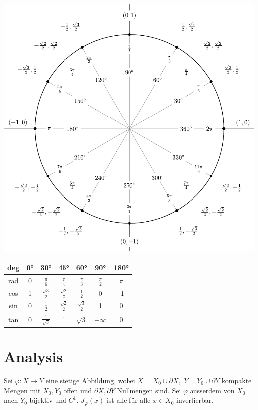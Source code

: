 \documentclass[a4paper,10pt]{article}
\begin{document}
\begin{center}
	\includegraphics[width=0.7 \linewidth]{include_degrees_circle.pdf}
\end{center}

\begin{mainbox}{}
	\begin{center}
		\begin{tabular}{c|cccccc}
			deg & 0° & 30°                  & 45°                  & 60°                  & 90°             & 180°  \\
			\midrule
			rad & 0  & $\frac{\pi}{6}$      & $\frac{\pi}{4}$      & $\frac{\pi}{3}$      & $\frac{\pi}{2}$ & $\pi$ \\
			cos & 1  & $\frac{\sqrt{3}}{2}$ & $\frac{\sqrt{2}}{2}$ & $\frac{1}{2}$        & 0               & -1    \\
			sin & 0  & $\frac{1}{2}$        & $\frac{\sqrt{2}}{2}$ & $\frac{\sqrt{3}}{2}$ & 1               & 0     \\
			tan & 0  & $\frac{1}{\sqrt{3}}$ & 1                    & $\sqrt{3}$           & $+\infty$       & 0     \\
		\end{tabular}
	\end{center}
\end{mainbox}

\section{Analysis}

Sei \(\varphi : X \mapsto Y\) eine stetige Abbildung, wobei \(X=  X_0 \cup \partial X, \) \(Y = Y_0 \cup \partial Y\) kompakte Mengen mit \(X_0, Y_0\) offen und \(\partial X, \partial Y\) Nullmengen sind. Sei $\varphi$ ausserdem von $X_0$ nach $Y_0$ bijektiv und $C^1$. $J_\varphi(x)$ ist alle für alle $x \in X_0$ invertierbar.
\end{document}
